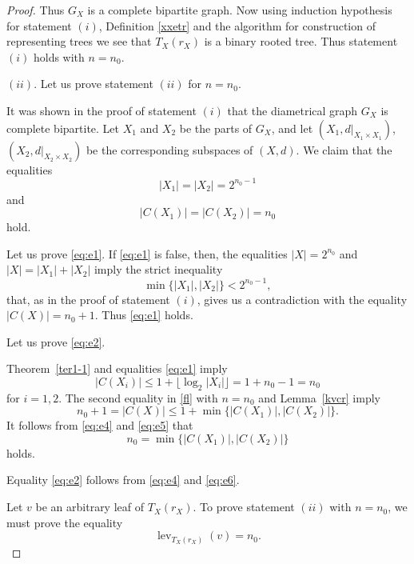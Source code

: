 \documentclass{raex}
\theoremstyle{definition}
\theoremstyle{remark}
\numberwithin{equation}{section}
\begin{document}
\begin{proof}
Thus $G_X$ is a complete bipartite graph. Now using induction hypothesis for statement $(i)$, Definition \ref{xxetr} and the algorithm for construction of representing trees we see that $T_X(r_X)$ is a binary rooted tree. Thus statement $(i)$ holds with $n=n_0$.

 
$(ii)$. Let us prove statement $(ii)$ for $n=n_0$.



It was shown in the proof of statement $(i)$ that the diametrical
graph $G_X$ is complete bipartite. Let $X_1$ and $X_2$ be the parts of
$G_X$, and let $(X_1,d|_{X_1\times X_1})$, $(X_2,d|_{X_2\times X_2})$ be the corresponding subspaces of $(X,d)$.
We claim that the equalities
\begin{equation}\label{eq:e1}
|X_1|=|X_2|=2^{n_0-1}
\end{equation}
and
\begin{equation}\label{eq:e2}
|C(X_1)|=|C(X_2)|=n_0
\end{equation}
hold.

Let us prove \eqref{eq:e1}. If \eqref{eq:e1} is false, then, 
the equalities $|X|=2^{n_0}$ and $|X|=|X_1|+|X_2|$ imply
the strict inequality
\begin{equation*}
\min\{|X_1|,|X_2|\}<2^{n_0-1},
\end{equation*}
that, as in the proof of statement $(i)$, gives us a contradiction with the equality $|C(X)|=n_0+1$. 
Thus \eqref{eq:e1} holds.

Let us prove \eqref{eq:e2}. 

Theorem~\ref{ter1-1} and equalities \eqref{eq:e1} imply
\begin{equation}\label{eq:e4}
|C(X_i)|\le 1+\lfloor \log_2 |X_i| \rfloor = 1+n_0-1=n_0
\end{equation}
for $i=1,2$.
The second equality in \eqref{fl}  with \(n=n_0\) and Lemma~\ref{kvcr} imply
\begin{equation}\label{eq:e5}
n_0+1=|C(X)|\le 1+\min\{|C(X_1)|,|C(X_2)|\}.
\end{equation}
It follows from \eqref{eq:e4} and \eqref{eq:e5} that
\begin{equation}\label{eq:e6}
n_0=\min\{|C(X_1)|,|C(X_2)|\}
\end{equation}
holds.

Equality \eqref{eq:e2} follows from \eqref{eq:e4} and \eqref{eq:e6}.

Let $v$ be an arbitrary leaf of $T_X(r_X)$. To prove statement $(ii)$ with $n=n_0$, we must prove the equality
\begin{equation}
    \label{oo1}
\operatorname{lev}_{T_X(r_X)}(v)=n_0.
\end{equation}


\end{proof}
\end{document}
